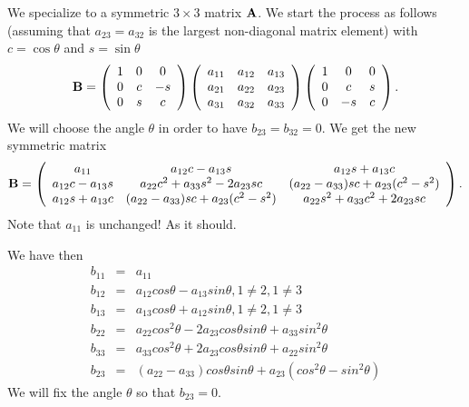We specialize to a symmetric $3\times 3 $ matrix ${\bf A}$.
We start the process as follows (assuming that $a_{23}=a_{32}$ is the largest non-diagonal matrix element)
with $c=\cos{\theta}$ and $s=\sin{\theta}$
%
\[
 {\bf B} =
      \left( \begin{array}{ccc} 
                1 & 0 & 0    \\
                0 & c & -s     \\
                0 & s & c
             \end{array} \right)\left( \begin{array}{ccc} 
                a_{11} & a_{12} & a_{13}    \\
                a_{21} & a_{22} & a_{23}     \\
                a_{31} & a_{32} & a_{33}
             \end{array} \right)
              \left( \begin{array}{ccc} 
                1 & 0 & 0    \\
                0 & c & s     \\
                0 & -s & c
             \end{array} \right).
\]
We will choose the angle $\theta$ in order to have $b_{23}=b_{32}=0$.
We get the new symmetric matrix
\[
 {\bf B} =\left( \begin{array}{ccc} 
                a_{11} & a_{12}c -a_{13}s& a_{12}s+a_{13}c    \\
                a_{12}c -a_{13}s & a_{22}c^2+a_{33}s^2 -2a_{23}sc& (a_{22}-a_{33})sc +a_{23}(c^2-s^2)     \\
                a_{12}s+a_{13}c & (a_{22}-a_{33})sc +a_{23}(c^2-s^2) & a_{22}s^2+a_{33}c^2 +2a_{23}sc
             \end{array} \right).
\]
Note that $a_{11}$ is unchanged! As it should.

We have then
\begin{eqnarray*}
b_{11} &=& a_{11} \\
b_{12} &=& a_{12}cos\theta - a_{13}sin\theta , 1 \ne 2, 1 \ne 3 \\
b_{13} &=& a_{13}cos\theta + a_{12}sin\theta , 1 \ne 2, 1 \ne 3 \nonumber\\
b_{22} &=& a_{22}cos^2\theta - 2a_{23}cos\theta sin\theta +a_{33}sin^2\theta\nonumber\\
b_{33} &=& a_{33}cos^2\theta +2a_{23}cos\theta sin\theta +a_{22}sin^2\theta\nonumber\\
b_{23} &=& (a_{22}-a_{33})cos\theta sin\theta +a_{23}(cos^2\theta-sin^2\theta)\nonumber 
\end{eqnarray*}
We will fix the angle $\theta$ so that $b_{23}=0$.


